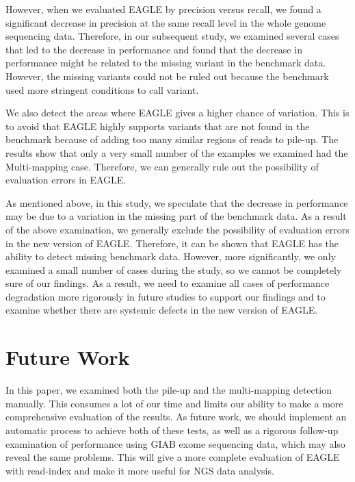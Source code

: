 \documentclass[PhD]{PHlab-thesis}
\begin{document}
However, when we evaluated EAGLE by precision versus recall, we found a significant decrease in precision at the same recall level in the whole genome sequencing data. Therefore, in our subsequent study, we examined several cases that led to the decrease in performance and found that the decrease in performance might be related to the missing variant in the benchmark data. However, the missing variants could not be ruled out because the benchmark used more stringent conditions to call variant.

We also detect the areas where EAGLE gives a higher chance of variation. This is to avoid that EAGLE highly supports variants that are not found in the benchmark because of adding too many similar regions of reads to pile-up. The results show that only a very small number of the examples we examined had the Multi-mapping case. Therefore, we can generally rule out the possibility of evaluation errors in EAGLE.

As mentioned above, in this study, we speculate that the decrease in performance may be due to a variation in the missing part of the benchmark data. As a result of the above examination, we generally exclude the possibility of evaluation errors in the new version of EAGLE. Therefore, it can be shown that EAGLE has the ability to detect missing benchmark data. However, more significantly, we only examined a small number of cases during the study, so we cannot be completely sure of our findings. As a result, we need to examine all cases of performance degradation more rigorously in future studies to support our findings and to examine whether there are systemic defects in the new version of EAGLE.
\section{Future Work}
In this paper, we examined both the pile-up and the multi-mapping detection manually. This consumes a lot of our time and limits our ability to make a more comprehensive evaluation of the results. As future work, we should implement an automatic process to achieve both of these tests, as well as a rigorous follow-up examination of performance using GIAB exome sequencing data, which may also reveal the same problems. This will give a more complete evaluation of EAGLE with read-index and make it more useful for NGS data analysis.

\newpage
{}
\printbibliography
\end{document}
